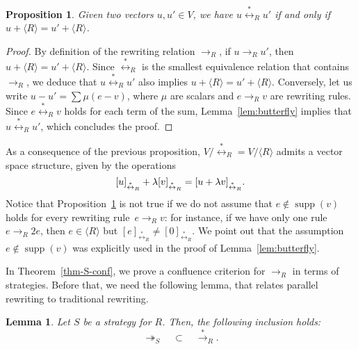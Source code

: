 \documentclass[11pt]{article}
\newtheorem{lemma}[theorem]{Lemma}
\newtheorem{proposition}[theorem]{Proposition}
\theoremstyle{definition}
\DeclareMathOperator{\supp}{supp}
\newcommand\Span[1]{\langle #1\rangle}
\newcommand\rewR{\to_R}
\newcommand\parS{\twoheadrightarrow_S}
\newcommand\transR{\overset{*}{\to}_R}
\newcommand\equivR{\overset{*}{\leftrightarrow}_R}
\begin{document}
\begin{proposition}\label{prop:vs_structure}
  Given two vectors $u,u'\in V$, we have $u\equivR u'$ if and only if
  $u + \Span{R} = u'+\Span{R}$.
\end{proposition}

\begin{proof}
  By definition of the rewriting relation $\rewR$, if $u\rewR u'$, then
  $u + \Span{R} =u'+\Span{R}$. Since $\equivR$ is the smallest equivalence relation
  that contains $\rewR$, we deduce that $u\equivR u'$ also implies
  $u+\Span{R}=u'+\Span{R}$. Conversely, let us write $u-u'=\sum\mu(e-v)$, where
  $\mu$ are scalars and $e\rewR v$ are rewriting rules. Since
  $e\equivR v$ holds for each term of the sum, Lemma~\ref{lem:butterfly}
  implies that $u\equivR u'$, which concludes the proof.
\end{proof}
\smallskip

As a consequence of the previous proposition, $V/\equivR = V/\Span{R}$
admits a vector space structure, given by the operations
\[[u]_{\equivR}+\lambda[v]_{\equivR}=[u+\lambda v]_{\equivR}.\smallskip\]
\noindent
Notice that Proposition~\ref{prop:vs_structure} is not true if we do not
assume that $e\notin\supp(v)$ holds for every rewriting rule~$e\rewR v$: 
for instance, if we have only one rule $e\rewR 2e$, then $e\in\Span{R}$ 
but $[e]_{\equivR}\neq[0]_{\equivR}$. We point out that the assumption
$e\notin\supp(v)$ was explicitly used in the proof of
Lemma~\ref{lem:butterfly}.
\medskip

In Theorem~\ref{thm-S-conf}, we prove a confluence criterion for $\rewR$
in terms of strategies. Before that, we need the following lemma, that
relates parallel rewriting to traditional rewriting.
\smallskip

\begin{lemma}\label{lem:strategies}
  Let $S$ be a strategy for $R$. Then, the following inclusion holds:
  \[\parS\quad\subset\quad\transR.\]
\end{lemma}
\end{document}
